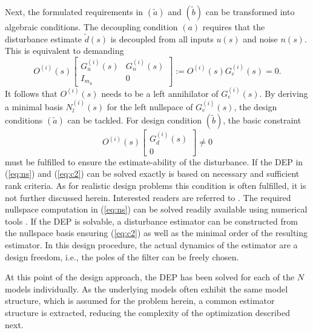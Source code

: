 \documentclass[graybox]{svmult}
\begin{document}
Next, the formulated requirements in $(\tilde a)$ and $(\tilde b)$ can be transformed into  algebraic conditions. 
The decoupling condition $(a)$ requires that the disturbance estimate $\tilde d(s)$ is decoupled from all inputs $u(s)$ and noise $n(s)$. This is equivalent to demanding 
\begin{equation}\label{eq:ns}
O^{(i)}(s) 
\begin{bmatrix}
G_u^{(i)}(s) & G^{(i)}_{n}(s)  \\ I_{m_u}& 0
\end{bmatrix}
:= O^{(i)}(s) G_e^{(i)}(s) =  0.
\end{equation}
It follows that $O^{(i)}(s)$ needs to be a left annihilator of $G_e^{(i)}(s)$. 
By deriving a minimal basis $N_l^{(i)}(s)$ for the left nullspace of $G_e^{(i)}(s)$,  the design conditions $(\tilde a)$ can be tackled. For design condition $(\tilde b)$, the basic constraint
\begin{equation}\label{eq:c2}
O^{(i)}(s) 
\begin{bmatrix}
G_{d}^{(i)}(s)  \\  0
\end{bmatrix}
\neq  0
\end{equation}
must be fulfilled to ensure the estimate-ability of the disturbance. If the DEP in (\ref{eq:ns}) and (\ref{eq:c2}) can be solved exactly is based on  necessary and sufficient rank criteria. As for realistic design problems this condition is often fulfilled, it is not further discussed herein. Interested readers are referred to \cite{Var09, Ossmann18ccta, Varga17}.
The required nullspace computation in (\ref{eq:ns})  can  be solved readily available using numerical tools \cite{Varga17}. If the DEP is solvable, a disturbance estimator can be constructed from the nullspace basis ensuring (\ref{eq:c2}) as well as the minimal order of the resulting estimator. In this design procedure, the actual dynamics of the estimator are a design freedom, i.e., the poles of the filter can be freely chosen.

At this point of the design approach, the DEP has been solved for each of the $N$ models individually. As the underlying models often exhibit the same model structure, which is assumed for the problem herein, a common estimator structure is extracted, reducing the complexity of the optimization described next. \vspace{-1mm}
\end{document}

